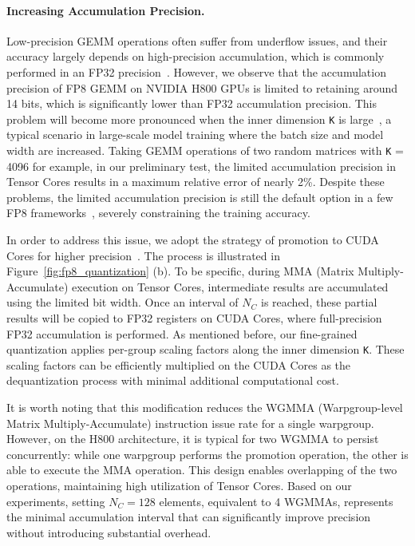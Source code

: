 \paragraph{Increasing Accumulation Precision.}
Low-precision GEMM operations often suffer from underflow issues, and their accuracy largely depends on high-precision accumulation, which is commonly performed in an FP32 precision~\citep{bf16train, fp16train}.
However, we observe that the accumulation precision of FP8 GEMM on NVIDIA H800 GPUs is limited to retaining around 14 bits, which is significantly lower than FP32 accumulation precision. 
This problem will become more pronounced when the inner dimension \texttt{K} is large~\citep{switchback}, a typical scenario in large-scale model training where the batch size and model width are increased. 
Taking GEMM operations of two random matrices with \texttt{K} = 4096 for example, in our preliminary test, the limited accumulation precision in Tensor Cores results in a maximum relative error of nearly 2\%. 
Despite these problems, the limited accumulation precision is still the default option in a few FP8 frameworks~\citep{transformerengine}, severely constraining the training accuracy. 

In order to address this issue, we adopt the strategy of promotion to CUDA Cores for higher precision~\citep{Thakkar_CUTLASS_2023}. 
The process is illustrated in Figure~\ref{fig:fp8_quantization} (b). 
To be specific, during MMA (Matrix Multiply-Accumulate) execution on Tensor Cores, intermediate results are accumulated using the limited bit width. 
Once an interval of $N_C$ is reached, these partial results will be copied to FP32 registers on CUDA Cores, where full-precision FP32 accumulation is performed.
As mentioned before, our fine-grained quantization applies per-group scaling factors along the inner dimension \texttt{K}. 
These scaling factors can be efficiently multiplied on the CUDA Cores as the dequantization process with minimal additional computational cost.

It is worth noting that this modification reduces the WGMMA (Warpgroup-level Matrix Multiply-Accumulate) instruction issue rate for a single warpgroup. However, on the H800 architecture, it is typical for two WGMMA to persist concurrently: while one warpgroup performs the promotion operation, the other is able to execute the MMA operation. This design enables overlapping of the two operations, maintaining high utilization of Tensor Cores.
Based on our experiments, setting $N_C=128$ elements, equivalent to 4 WGMMAs, represents the minimal accumulation interval that can significantly improve precision without introducing substantial overhead.

